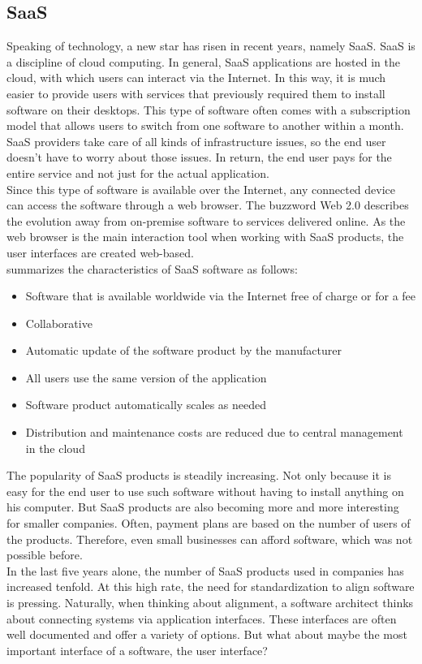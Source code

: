 \subsection{\acl{SaaS}}

Speaking of technology, a new star has risen in recent years, namely \acl{SaaS}. \acl{SaaS} is a discipline of cloud computing. In general, \ac{SaaS} applications are hosted in the cloud, with which users can interact via the Internet. In this way, it is much easier to provide users with services that previously required them to install software on their desktops. This type of software often comes with a subscription model that allows users to switch from one software to another within a month. \\
\ac{SaaS} providers take care of all kinds of infrastructure issues, so the end user doesn't have to worry about those issues. In return, the end user pays for the entire service and not just for the actual application. \\
Since this type of software is available over the Internet, any connected device can access the software through a web browser. The buzzword Web 2.0 describes the evolution away from on-premise software to services delivered online. As the web browser is the main interaction tool when working with \ac{SaaS} products, the user interfaces are created web-based. \cite{hill_guide_2013}\\
\citeauthor{hill_guide_2013} summarizes the characteristics of \ac{SaaS} software as follows:
\begin{itemize}
    \item Software that is available worldwide via the Internet free of charge or for a fee
    \item Collaborative
    \item Automatic update of the software product by the manufacturer
    \item All users use the same version of the application
    \item Software product automatically scales as needed
    \item Distribution and maintenance costs are reduced due to central management in the cloud
\end{itemize}
The popularity of \ac{SaaS} products is steadily increasing. Not only because it is easy for the end user to use such software without having to install anything on his computer. But \ac{SaaS} products are also becoming more and more interesting for smaller companies. Often, payment plans are based on the number of users of the products. Therefore, even small businesses can afford software, which was not possible before. \cite{sury_software-as--service-modell_2020}\\
In the last five years alone, the number of \ac{SaaS} products used in companies has increased tenfold. \cite{stastista_saas_2021} At this high rate, the need for standardization to align software is pressing. Naturally, when thinking about alignment, a software architect thinks about connecting systems via application interfaces. These interfaces are often well documented and offer a variety of options. But what about maybe the most important interface of a software, the user interface?